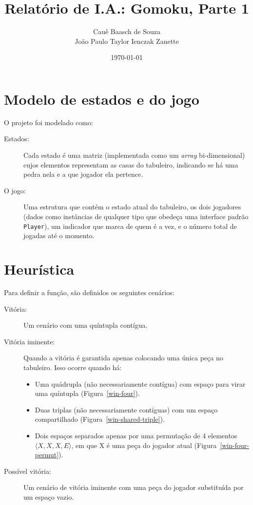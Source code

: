 \documentclass{article}
\title{Relatório de I.A.: Gomoku, Parte 1}
\author{Cauê Baasch de Souza \\
        João Paulo Taylor Ienczak Zanette}
\date{\today}
\begin{document}
    \maketitle{}

    \section{Modelo de estados e do jogo}

    O projeto foi modelado como:

    \begin{description}
        \item [Estados:] Cada estado é uma matriz (implementada como um
            \textit{array} bi-dimensional) cujos elementos representam as casas
            do tabuleiro, indicando se há uma pedra nela e a que jogador ela
            pertence.

        \item [O jogo:] Uma estrutura que contém o estado atual do tabuleiro,
            os dois jogadores (dados como instâncias de qualquer tipo que
            obedeça uma interface padrão \texttt{Player}), um indicador
            que marca de quem é a vez, e o número total de jogadas até o
            momento.
    \end{description}

    \section{Heurística}

    Para definir a função, são definidos os seguintes cenários:

    \begin{description}
        \item [Vitória:] Um cenário com uma quíntupla contígua.

        \item [Vitória iminente:] Quando a vitória é garantida apenas colocando
        uma única peça no tabuleiro. Isso ocorre quando há:
            \begin{itemize}
                \item Uma quádrupla (não necessariamente contígua) com espaço
                    para virar uma quíntupla (Figura~\ref{win-four}).
                \item Duas triplas (não necessariamente contíguas) com um
                    espaço compartilhado (Figura~\ref{win-shared-triple}).
                \item Dois espaços separados apenas por uma permutação de 4
                    elementos $\langle X, X, X, E \rangle$, em que X é uma peça
                    do jogador atual (Figura~\ref{win-four-permut}).
            \end{itemize}

        \item [Possível vitória:] Um cenário de vitória iminente com uma peça
        do jogador substituída por um espaço vazio.
    \end{description}
\end{document}
